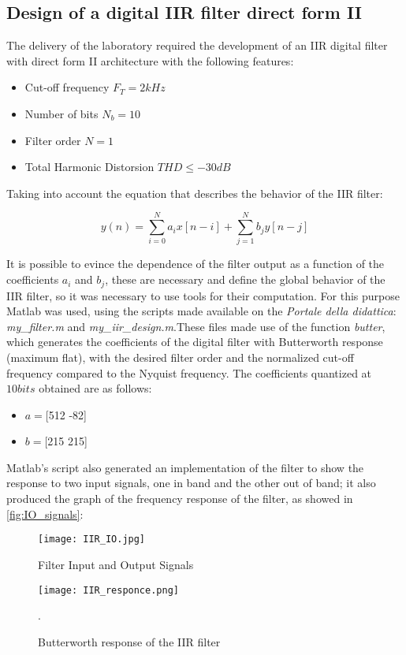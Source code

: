 \subsection{Design of a digital IIR filter direct form II}

The delivery of the laboratory required the development of an IIR digital filter with direct form II architecture with the following features:

\begin{itemize}
\item Cut-off frequency $F_{T} = 2 kHz$
\item Number of bits $N_{b} = 10$
\item Filter order $N = 1$
\item Total Harmonic Distorsion $THD \leq -30 dB$
\end{itemize}

\noindent Taking into account the equation that describes the behavior of the IIR filter:

\begin{equation}
y(n) = \sum_{i=0}^N a_{i}x[n-i]  + \sum_{j=1}^N b_{j}y[n-j]
\end{equation}

It is possible to evince the dependence of the filter output as a function of the coefficients $a_{i}$ and $b_{j}$, these are necessary and define the global behavior of the IIR filter, so it was necessary to use tools for their computation. For this purpose Matlab was used, using the scripts made available on the \textit{Portale della didattica}: \textit{my\_filter.m} and \textit{my\_iir\_design.m}.These files made use of the function \textit{butter}, which generates the coefficients of the digital filter with Butterworth response (maximum flat), with the desired filter order and the normalized cut-off frequency compared to the Nyquist frequency. The coefficients quantized at $10 bits$ obtained are as follows:

\begin{itemize}
\item $a = $[512 -82]
\item $b = $[215 215]
\end{itemize}

Matlab's script also generated an implementation of the filter to show the response to two input signals, one in band and the other out of band; it also produced the graph of the frequency response of the filter, as showed in \autoref{fig:IO_signals}:

\begin{figure}[ht]
	\begin{minipage}[b]{0.5\linewidth}
		\centering
		\texttt{[image: IIR\_IO.jpg]}
		\caption{Filter Input and Output Signals}
		\label{fig:IO_signals}
	\end{minipage}
	\hspace{0.1cm}
	\begin{minipage}[b]{0.4\linewidth}
		\centering
		\texttt{[image: IIR\_responce.png]}
		\caption{Butterworth response of the IIR filter}.
		\label{fig:Butterworth}
	\end{minipage}
\end{figure}

